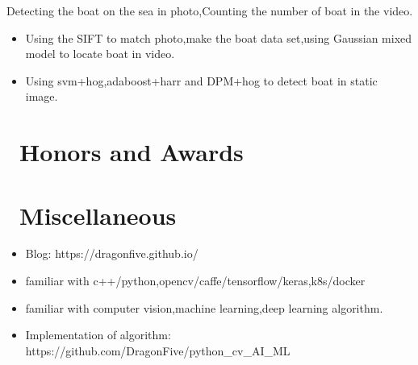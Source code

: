 \documentclass{resume}
\begin{document}
Detecting the boat on the sea in photo,Counting the number of boat in the video.
\begin{itemize}
  \item Using the SIFT to match photo,make the boat data set,using Gaussian mixed model to locate boat in video.
  \item Using svm+hog,adaboost+harr and DPM+hog to detect boat in static image.
\end{itemize}


\section{\faHeartO\ Honors and Awards}

\section{\faInfo\ Miscellaneous}
\begin{itemize}[parsep=0.5ex]
  \item Blog: https://dragonfive.github.io/
  \item familiar with c++/python,opencv/caffe/tensorflow/keras,k8s/docker
  \item familiar with computer vision,machine learning,deep learning algorithm.
  \item Implementation of algorithm: https://github.com/DragonFive/python\_cv\_AI\_ML
\end{itemize}

%
%
\end{document}

